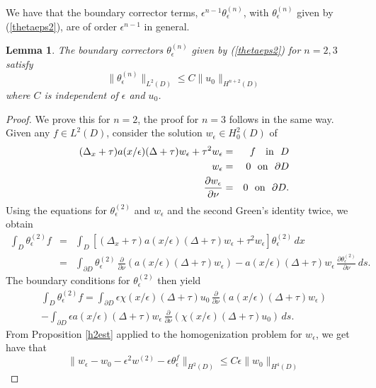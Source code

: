 \documentclass[12pt]{article}
\newtheorem{lemma}{Lemma}
\begin{document}
\noindent
We have that the boundary corrector terms, $\epsilon^{n-1}\theta_\epsilon^{(n)}$, with $\theta_\epsilon^{(n)}$ given by (\ref{thetaeps2}), are of order $\epsilon^{n-1}$ in general. 
\begin{lemma}\label{bcbounds} The boundary correctors $\theta_\epsilon^{(n)}$ given by (\ref{thetaeps2})  for $n=2,3$ satisfy 
$$\| \theta_\epsilon^{(n)}\|_{L^2( D)} \leq C\| u_0 \|_{H^{n+2}( D)} $$
where $C$ is independent of $\epsilon$ and $u_0$. \end{lemma}
\begin{proof}  We prove this for $n=2$, the proof for $n=3$ follows in the same way. 
Given any $f\in L^2( D)$, consider the solution $w_\epsilon\in H^2_0( D)$ of 
\begin{eqnarray}  \label{wepseq} (\Delta_x +\tau) a(x/\epsilon) (\Delta +\tau) w_\epsilon +\tau^2 w_\epsilon&=& f \ \ \ \mbox{in}\ \  D \\ 
w_\epsilon &=& 0 \ \ \mbox{on}\ \ \partial D \nonumber \\ {\partial w_\epsilon} \over{\partial\nu}&=& 0 \ \ \mbox{on}\ \ \partial D.\end{eqnarray}
Using the equations for $\theta_\epsilon^{(2)}$ and $w_\epsilon$ and the second Green's identity twice,  we obtain
\begin{eqnarray}
\int_ D \theta_\epsilon^{(2)} f &=&\int_{ D} \left[(\Delta_x +\tau) a(x/\epsilon) (\Delta +\tau) w_\epsilon +\tau^2 w_\epsilon\right] \theta_\epsilon^{(2)}\,dx\nonumber\\
&=& \int_{\partial  D}\theta_\epsilon^{(2)} \, \frac{\partial}{\partial\nu} \left(a(x/\epsilon) (\Delta +\tau) w_\epsilon\right)- a(x/\epsilon) (\Delta +\tau) w_\epsilon \,\frac{\partial \theta_\epsilon^{(2)}}{\partial \nu} \, ds.
\end{eqnarray}
The boundary conditions for $\theta_\epsilon^{(2)}$  then yield
\begin{multline}\label{eqthetaafterbcs}
\int_ D \theta_\epsilon^{(2)} f =  \int_{\partial  D}\epsilon\chi(x/\epsilon)(\Delta +\tau)u_0 \, \frac{\partial}{\partial\nu}\left(  a(x/\epsilon) (\Delta +\tau) w_\epsilon\right)\\ - \int_{\partial D} \epsilon a(x/\epsilon) (\Delta +\tau) w_\epsilon \,\frac{\partial}{\partial\nu} \left(\chi(x/\epsilon)(\Delta +\tau)u_0\right) \, ds.
\end{multline}
From Proposition \ref{h2est} applied to the homogenization problem for $w_\epsilon$, we get have that 
\begin{equation}\label{l2estlapwiththeta} \| w_\epsilon - w_0 -\epsilon^2 w^{(2)} - \epsilon \theta^f_\epsilon \|_{H^2( D)} \leq C\epsilon \| w_0\|_{H^4( D)} \end{equation}

\end{proof}
\end{document}
